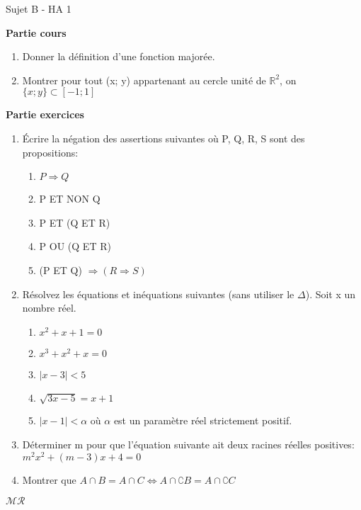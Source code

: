 \documentclass[a4paper,12pt, landscape]{article}
\begin{document}
\begin{multicols*}{3}
\vfill\null
\columnbreak
\centerline{Sujet B - HA 1}

\begin{flushleft}
  \textbf{Partie cours} 
\end{flushleft} 
\begin{enumerate}
  \item Donner la définition d'une fonction majorée.
  \item Montrer pour tout (x; y) appartenant au cercle unité de $\mathbb{R}^2$, on $\{x; y\} \subset \left[-1;1\right]$
\end{enumerate}
\textbf{Partie exercices}
\begin{enumerate}
  \item Écrire la négation des assertions suivantes où P, Q, R, S sont des propositions:
  \begin{enumerate}
    \item $P \Rightarrow Q$
    \item P ET NON Q
    \item P ET (Q ET R)
    \item P OU (Q ET R)
    \item (P ET Q) $\Rightarrow (R \Rightarrow S)$ 
  \end{enumerate}
  \item Résolvez les équations et inéquations suivantes (sans utiliser le $\Delta$). Soit x un nombre réel.
  \begin{enumerate}
    \item $x^2 + x + 1 = 0$
    \item $x^3 + x^2 + x = 0$
    \item $|x-3| < 5$
    \item $\sqrt{3x-5} = x+1$
    \item $|x - 1| < \alpha$ où $\alpha$ est un paramètre réel strictement positif.
  \end{enumerate}
  \item Déterminer m pour que l'équation suivante ait deux racines réelles positives: $m^2x^2 + (m-3)x + 4 = 0$
  \item Montrer que $A \cap B = A \cap C \Leftrightarrow A \cap \complement{B} = A \cap \complement{C}$
\end{enumerate}
\centerline{$\mathcal{MR}$}


\end{multicols*}
\end{document}
